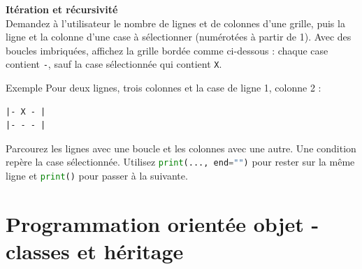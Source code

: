 \begin{Exercice}[15 minutes] \textbf{Itération et récursivité}\\
    Demandez à l'utilisateur le nombre de lignes et de colonnes d'une grille, puis la ligne et la colonne d'une case à sélectionner (numérotées à partir de 1).
    Avec des boucles imbriquées, affichez la grille bordée comme ci-dessous : chaque case contient \lstinline{-}, sauf la case sélectionnée qui contient \lstinline{X}.

    \begin{Example}{\faTerminal \quad Exemple}
        Pour deux lignes, trois colonnes et la case de ligne 1, colonne 2 :
        \begin{lstlisting}[language=texte,numbers=none,belowskip=0pt]
|- X - |
|- - - |
\end{lstlisting}
    \end{Example}

    \begin{conseil}
        Parcourez les lignes avec une boucle et les colonnes avec une autre. Une condition repère la case sélectionnée. Utilisez \lstinline[language=Python]|print(..., end="")| pour rester sur la même ligne et \lstinline[language=Python]|print()| pour passer à la suivante.
    \end{conseil}

    \begin{solution}
        
    \end{solution}
\end{Exercice}

\section{Programmation orientée objet - classes et héritage}

